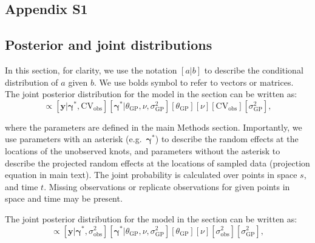 \documentclass[12pt,english]{article}
\begin{document}
\begin{spacing}{1.8}

\end{spacing}

\begin{spacing}{1.4}

\clearpage

\setcounter{section}{0}
\section{Appendix S1}

\linenumbers

\subsection{Posterior and joint distributions}

In this section, for clarity, we use the notation $[a|b]$ to describe the
conditional distribution of $a$ given $b$. We use bolds symbol to refer to vectors or matrices.
The joint posterior distribution for
the model in the section \textit{} can be written
as:
\begin{equation}
  [
  \bm{\gamma}^*,
  \theta_{\mathrm{GP}},
  \nu,
  \mathrm{CV}_\mathrm{obs},
  \sigma_{\mathrm{GP}}^2
  |
  \bm{y}]
  \propto
  [\bm{y} | \bm{\gamma}^*, \mathrm{CV}_\mathrm{obs}]
  [\bm{\gamma}^* | \theta_{\mathrm{GP}}, \nu, \sigma_{\mathrm{GP}}^2]
  [\theta_{\mathrm{GP}}]
  [\nu]
  [\mathrm{CV}_\mathrm{obs}]
  [\sigma_{\mathrm{GP}}^2],
\end{equation}

\noindent where the parameters are defined in the main Methods section.
Importantly, we use parameters with an asterisk (e.g.\ $\bm{\gamma}^*$) to describe
the random effects at the locations of the unobserved knots, and parameters
without the asterisk to describe the projected random effects
at the locations of sampled data (projection equation in main text). The joint
probability is calculated over points in space $s$, and time $t$. Missing
observations or replicate observations for given points in space and time may be
present.

The joint posterior distribution for the model in the section
\textit{} can be written as:
\begin{equation}
  [
  \bm{\gamma}^*,
  \theta_{\mathrm{GP}},
  \nu,
  \sigma^2_{\mathrm{obs}},
  \sigma_{\mathrm{GP}}^2
  |
  \bm{y}]
  \propto
  [\bm{y} | \bm{\gamma}^*, \sigma^2_{\mathrm{obs}}]
  [\bm{\gamma}^* | \theta_{\mathrm{GP}}, \nu, \sigma_{\mathrm{GP}}^2]
  [\theta_{\mathrm{GP}}]
  [\nu]
  [\sigma^2_{\mathrm{obs}}]
  [\sigma_{\mathrm{GP}}^2],
\end{equation}


\end{spacing}
\end{document}
